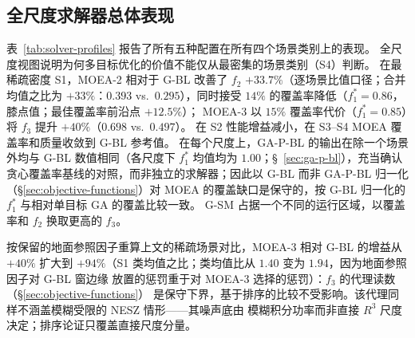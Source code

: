 \documentclass[preprint,12pt,authoryear]{elsarticle}
\begin{document}
\subsection{全尺度求解器总体表现}
\label{sec:overall-performance}
表~\ref{tab:solver-profiles} 报告了所有五种配置在所有四个场景类别上的表现。
全尺度视图说明为何多目标优化的价值不能仅从最密集的场景类别（S4）判断。
在最稀疏密度 S1，MOEA-2 相对于 G-BL 改善了 $f_2$ $+33.7\%$（逐场景比值口径；合并均值之比为 $+33\%$：$0.393$ vs.\ $0.295$），同时接受 $14\%$ 的覆盖率降低（$f_1^* = 0.86$，膝点值；最佳覆盖率前沿点 $+12.5\%$）；
MOEA-3 以 $15\%$ 覆盖率代价（$f_1^* = 0.85$）将 $f_3$ 提升 $+40\%$（$0.698$ vs.\ $0.497$）。
在 S2 性能增益减小，在 S3--S4 MOEA 覆盖率和质量收敛到 G-BL 参考值。
在每个尺度上，GA-P-BL 的输出在除一个场景外均与 G-BL 数值相同（各尺度下 $f_1^*$ 均值均为 $1.00$；\S~\ref{sec:ga-p-bl}），充当确认贪心覆盖率基线的对照，而非独立的求解器；因此以 G-BL 而非 GA-P-BL 归一化（\S\ref{sec:objective-functions}）对 MOEA 的覆盖缺口是保守的，按 G-BL 归一化的 $f_1^*$ 与相对单目标 GA 的覆盖比较一致。
G-SM 占据一个不同的运行区域，以覆盖率和 $f_2$ 换取更高的 $f_3$。

按保留的地面参照因子重算上文的稀疏场景对比，MOEA-3 相对 G-BL 的增益从 $+40\%$ 扩大到
$+94\%$（S1 类均值之比；类均值比从 $1.40$ 变为 $1.94$，因为地面参照因子对 G-BL 窗边缘
放置的惩罚重于对 MOEA-3 选择的惩罚）：$f_3$ 的代理读数（\S\ref{sec:objective-functions}）
是保守下界，基于排序的比较不受影响。该代理同样不涵盖模糊受限的 NESZ 情形——其噪声底由
模糊积分功率而非直接 $R^3$ 尺度决定；排序论证只覆盖直接尺度分量。
\end{document}
